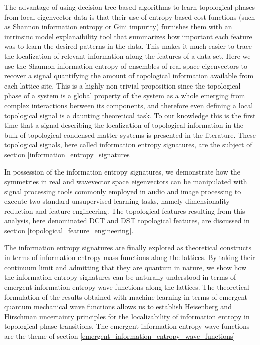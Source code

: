 \documentclass[10pt]{revtex4-1}
\begin{document}
The advantage of using decision tree-based algorithms to learn topological phases from local eigenvector data is that their use of entropy-based cost functions (such as Shannon information entropy or Gini impurity) furnishes them with an intrinsinc model explanaibility tool that summarizes how important each feature was to learn the desired patterns in the data. This makes it much easier to trace the localization of relevant information along the features of a data set. Here we use the Shannon information entropy of ensembles of real space eigenvectors to recover a signal quantifying the amount of topological information available from each lattice site. This is a highly non-trivial proposition since the topological phase of a system is a global property of the system as a whole emerging from complex interactions between its components, and therefore even defining a local topological signal is a daunting theoretical task. To our knowledge this is the first time that a signal describing the localization of topological information in the bulk of topological condensed matter systems is presented in the literature. These topological signals, here called information entropy signatures, are the subject of section \ref{information_entropy_signatures} 

In possession of the information entropy signatures, we demonstrate how the symmetries in real and wavevector space eigenvectors can be manipulated with signal processing tools commonly employed in audio and image processing to execute two standard unsupervised learning tasks, namely dimensionality reduction and feature engineering. The topological features resulting from this analysis, here denominated DCT and DST topological features, are discussed in section \ref{topological_feature_engineering}.    

The information entropy signatures are finally explored as theoretical constructs in terms of information entropy mass functions along the lattices. By taking their continuum limit and admitting that they are quantum in nature, we show how the information entropy signatures can be naturally understood in terms of emergent information entropy wave functions along the lattices. The theoretical formulation of the results obtained with machine learning in terms of emergent quantum mechanical wave functions allows us to establish Heisenberg and Hirschman uncertainty principles for the localizability of information entropy in topological phase transitions. The emergent information entropy wave functions are the theme of section \ref{emergent_information_entropy_wave_functions}      
\end{document}
